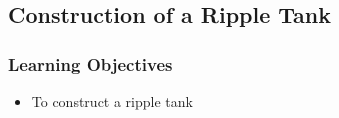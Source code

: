 


\subsection{Construction of a Ripple Tank}

\subsubsection*{Learning Objectives}
\begin{itemize}
\item{To construct a ripple tank} 
\end{itemize}

